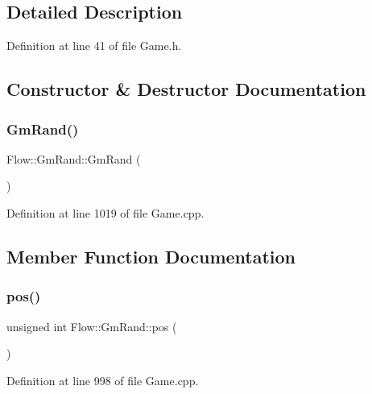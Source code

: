 \subsection{Detailed Description}


Definition at line 41 of file Game.\+h.



\subsection{Constructor \& Destructor Documentation}
\hypertarget{class_flow_1_1_gm_rand_ad390906fe6a436491ff053e3337c70a9}{}\label{class_flow_1_1_gm_rand_ad390906fe6a436491ff053e3337c70a9} 
\subsubsection{\texorpdfstring{Gm\+Rand()}{GmRand()}}
{\footnotesize\ttfamily Flow\+::\+Gm\+Rand\+::\+Gm\+Rand (\begin{DoxyParamCaption}{ }\end{DoxyParamCaption})}



Definition at line 1019 of file Game.\+cpp.



\subsection{Member Function Documentation}
\hypertarget{class_flow_1_1_gm_rand_aef1a411df95f3d49a7180fbcd9d432c1}{}\label{class_flow_1_1_gm_rand_aef1a411df95f3d49a7180fbcd9d432c1} 
\subsubsection{\texorpdfstring{pos()}{pos()}}
{\footnotesize\ttfamily unsigned int Flow\+::\+Gm\+Rand\+::pos (\begin{DoxyParamCaption}{ }\end{DoxyParamCaption})}



Definition at line 998 of file Game.\+cpp.

\hypertarget{class_flow_1_1_gm_rand_a0603fa7f0b3aeb979ca2beeb628e0899}{}\label{class_flow_1_1_gm_rand_a0603fa7f0b3aeb979ca2beeb628e0899} 
